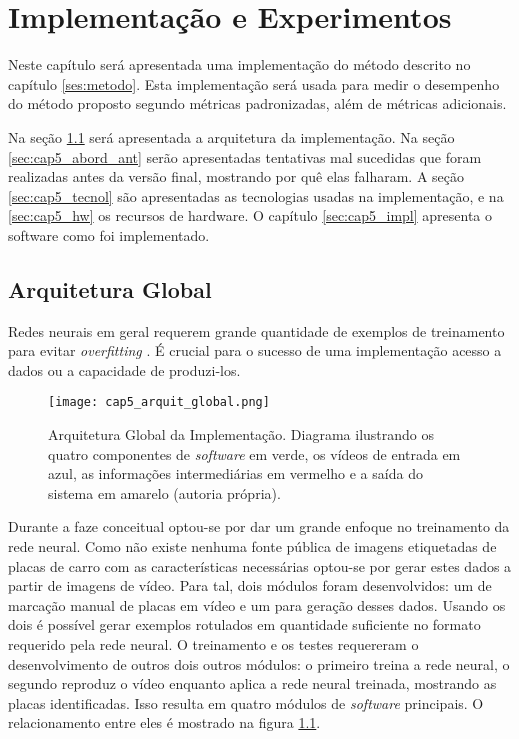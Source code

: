 
\chapter{Implementação e Experimentos}

Neste capítulo será apresentada uma implementação do método descrito
no capítulo \ref{ses:metodo}. Esta implementação será usada para medir o
desempenho do método proposto segundo métricas padronizadas, além de métricas
adicionais.

Na seção \ref{sec:cap5:arq} será apresentada a arquitetura da implementação.
Na seção \ref{sec:cap5_abord_ant} serão apresentadas tentativas mal sucedidas
que foram realizadas antes da versão final, mostrando por quê elas falharam. A
seção \ref{sec:cap5_tecnol} são apresentadas as tecnologias usadas na
implementação, e na \ref{sec:cap5_hw} os recursos de hardware. O capítulo
\ref{sec:cap5_impl} apresenta o software como foi implementado.

\section{Arquitetura Global} \label{sec:cap5:arq}
Redes neurais em geral requerem grande quantidade de exemplos de treinamento
para evitar \emph{overfitting} \cite{hawkins2004problem}. É crucial para o
sucesso de uma implementação acesso a dados ou a capacidade de produzi-los.

\begin{figure}[!htb]
	\centering
	\texttt{[image: cap5\_arquit\_global.png]}
	\caption[Arquitetura Global da Implementação]{
		Arquitetura Global da Implementação.
		Diagrama ilustrando os quatro componentes de \emph{software} em verde, os
		vídeos
		de entrada em azul, as informações intermediárias em vermelho e a saída do
		sistema em amarelo (autoria própria).}
	\label{fig:cap5_arquit_global}
\end{figure}

Durante a faze conceitual optou-se por dar um grande enfoque no
treinamento da rede neural. Como não existe nenhuma fonte pública de imagens
etiquetadas de placas de carro com as características necessárias optou-se por
gerar estes dados a partir de imagens de vídeo.
Para tal, dois módulos foram desenvolvidos: um de
marcação manual de placas em vídeo e um para geração desses dados.
Usando os dois é possível gerar exemplos rotulados em quantidade
suficiente no formato requerido pela rede neural. O treinamento e os testes
requereram o desenvolvimento de outros dois outros módulos: o primeiro
treina a rede neural, o segundo reproduz o vídeo enquanto aplica a rede neural
treinada, mostrando as placas identificadas. Isso resulta em quatro módulos de
\emph{software} principais. O relacionamento entre eles é mostrado na figura
\ref{fig:cap5_arquit_global}.

